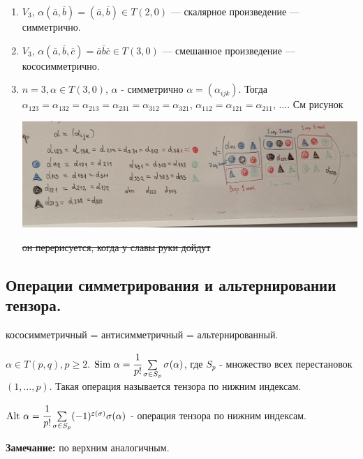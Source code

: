 \begin{enumerate}
    \item $V_3$, $\alpha(\overline{a}, \overline{b}) = (\overline{a}, \overline{b})\in T(2,0)$ --- скалярное произведение --- симметрично.
     \item $V_3$, $\alpha(\overline{a}, \overline{b}, \overline{c}) = \overline{a} \overline{b}\overline{c}\in T(3,0)$ --- смешанное произведение --- кососимметрично.
     \item $n =3, \alpha \in T(3,0)$, $\alpha$ - симметрично $\alpha = (\alpha_{ijk})$. Тогда $\alpha_{123}=\alpha_{132}=\alpha_{213}= \alpha_{231} = \alpha_{312} = \alpha_{321}$, $\alpha_{112} = \alpha_{121}  =\alpha_{211}$, $\ldots$. См рисунок

     \begin{center}
         \includegraphics[width = 18cm]{assets/8_4-table.jpg}
     \end{center}
     \sout{он перерисуется, когда у славы руки дойдут}
\end{enumerate}

\pagebreak
\subsection{Операции симметрирования и альтернировании тензора.}

кососимметричный = антисимметричный = альтернированный.

 $\alpha \in T(p,q), p \geq 2$. $\text{Sim } \alpha = \cfrac{1}{p!}\sum\limits_{\sigma \in S_p}\sigma(\alpha)$, где $S_p$ - множество всех перестановок $(1,\ldots, p)$. Такая операция называется  тензора по нижним индексам.

 $\text{Alt } \alpha = \cfrac{1}{p!}\sum\limits_{\sigma \in S_p}(-1)^{\varepsilon(\sigma)}\sigma(\alpha)$ - операция   тензора по нижним индексам.

\textbf{Замечание:} по верхним аналогичным.

